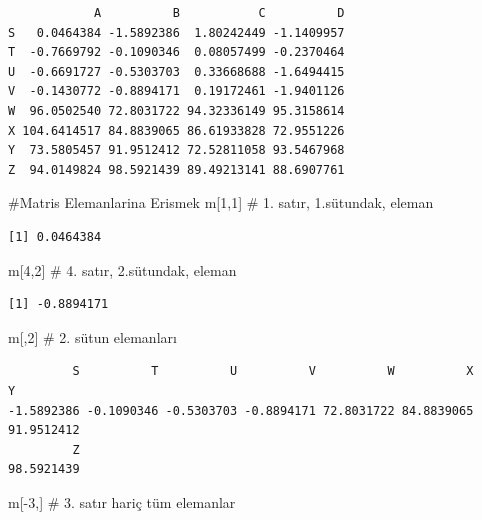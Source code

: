 \documentclass[
  letterpaper,
  DIV=11,
  numbers=noendperiod]{scrreprt}
\newenvironment{Shaded}{\begin{snugshade}}{\end{snugshade}}
\newcommand{\CommentTok}[1]{\textcolor[rgb]{0.37,0.37,0.37}{#1}}
\newcommand{\DecValTok}[1]{\textcolor[rgb]{0.68,0.00,0.00}{#1}}
\newcommand{\NormalTok}[1]{\textcolor[rgb]{0.00,0.23,0.31}{#1}}
\newcommand{\SpecialCharTok}[1]{\textcolor[rgb]{0.37,0.37,0.37}{#1}}
\begin{document}
\begin{verbatim}
            A          B           C          D
S   0.0464384 -1.5892386  1.80242449 -1.1409957
T  -0.7669792 -0.1090346  0.08057499 -0.2370464
U  -0.6691727 -0.5303703  0.33668688 -1.6494415
V  -0.1430772 -0.8894171  0.19172461 -1.9401126
W  96.0502540 72.8031722 94.32336149 95.3158614
X 104.6414517 84.8839065 86.61933828 72.9551226
Y  73.5805457 91.9512412 72.52811058 93.5467968
Z  94.0149824 98.5921439 89.49213141 88.6907761
\end{verbatim}

\begin{Shaded}
\begin{Highlighting}[]
\CommentTok{\#Matris Elemanlarina Erismek}
\NormalTok{m[}\DecValTok{1}\NormalTok{,}\DecValTok{1}\NormalTok{] }\CommentTok{\# 1. satır, 1.sütundak, eleman}
\end{Highlighting}
\end{Shaded}

\begin{verbatim}
[1] 0.0464384
\end{verbatim}

\begin{Shaded}
\begin{Highlighting}[]
\NormalTok{m[}\DecValTok{4}\NormalTok{,}\DecValTok{2}\NormalTok{] }\CommentTok{\# 4. satır, 2.sütundak, eleman}
\end{Highlighting}
\end{Shaded}

\begin{verbatim}
[1] -0.8894171
\end{verbatim}

\begin{Shaded}
\begin{Highlighting}[]
\NormalTok{m[,}\DecValTok{2}\NormalTok{] }\CommentTok{\# 2. sütun elemanları}
\end{Highlighting}
\end{Shaded}

\begin{verbatim}
         S          T          U          V          W          X          Y 
-1.5892386 -0.1090346 -0.5303703 -0.8894171 72.8031722 84.8839065 91.9512412 
         Z 
98.5921439 
\end{verbatim}

\begin{Shaded}
\begin{Highlighting}[]
\NormalTok{m[}\SpecialCharTok{{-}}\DecValTok{3}\NormalTok{,] }\CommentTok{\# 3. satır hariç tüm elemanlar}
\end{Highlighting}
\end{Shaded}
\end{document}
